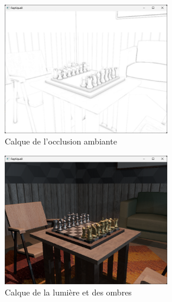     \begin{figure}[H] 
        \begin{subfigure}{0.3\textwidth}
            \centering
            \includegraphics[width=0.8\textwidth]{images/raptiquax_rendering_ssao.png}
            \caption{Calque de l'occlusion ambiante}
            \label{fig:graphics_pipeline_gbuffer_ssao}
        \end{subfigure}
        \begin{subfigure}{0.3\textwidth}
            \centering
            \includegraphics[width=0.8\textwidth]{images/raptiquax_rendering_lightings.png}
            \caption{Calque de la lumière et des ombres}
            \label{fig:graphics_pipeline_gbuffer_light}
        \end{subfigure}
        \begin{subfigure}{0.3\textwidth}
            \centering

\end{subfigure}
\end{figure}
